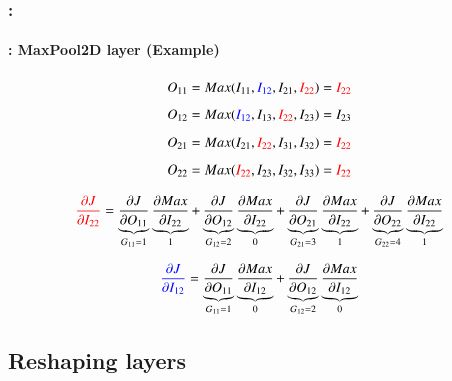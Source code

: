 \documentclass[xcolor=table]{beamer}
\begin{document}
\begin{frame}
	\frametitle{\insertshortsubtitle: \insertsection}
	\framesubtitle{\insertsubsection: MaxPool2D layer (Example)}
	
	
	\begin{center}
		\vskip-6pt
	\end{center}\vskip-16pt
	
	{\scriptsize 
		\[O_{11} = Max(I_{11}, \textcolor{blue}{I_{12}}, I_{21}, \textcolor{red}{I_{22}}) = \textcolor{red}{I_{22}}  \]
		\[O_{12} = Max(\textcolor{blue}{I_{12}}, I_{13}, \textcolor{red}{I_{22}}, I_{23}) = I_{23}  \]
		\[O_{21} = Max(I_{21}, \textcolor{red}{I_{22}}, I_{31}, I_{32}) = \textcolor{red}{I_{22}} \]
		\[O_{22} = Max(\textcolor{red}{I_{22}}, I_{23}, I_{32}, I_{33}) = \textcolor{red}{I_{22}}  \]
		
		\[\textcolor{red}{\frac{\partial J}{\partial I_{22}}} 
		= \underbrace{\frac{\partial J}{\partial O_{11}}}_{G_{11} = 1} 
		\underbrace{\frac{\partial Max}{\partial I_{22}}}_{1}
		+ \underbrace{\frac{\partial J}{\partial O_{12}}}_{G_{12} = 2} 
		\underbrace{\frac{\partial Max}{\partial I_{22}}}_{0}
		+ \underbrace{\frac{\partial J}{\partial O_{21}}}_{G_{21} = 3} 
		\underbrace{\frac{\partial Max}{\partial I_{22}}}_{1}
		+ \underbrace{\frac{\partial J}{\partial O_{22}}}_{G_{22} = 4} 
		\underbrace{\frac{\partial Max}{\partial I_{22}}}_{1}\]
		
		\[\textcolor{blue}{\frac{\partial J}{\partial I_{12}}} 
		= \underbrace{\frac{\partial J}{\partial O_{11}}}_{G_{11} = 1} 
		\underbrace{\frac{\partial Max}{\partial I_{12}}}_{0}
		+ \underbrace{\frac{\partial J}{\partial O_{12}}}_{G_{12} = 2} 
		\underbrace{\frac{\partial Max}{\partial I_{12}}}_{0}\]
	}
	
\end{frame}


\subsection{Reshaping layers}
\end{document}
